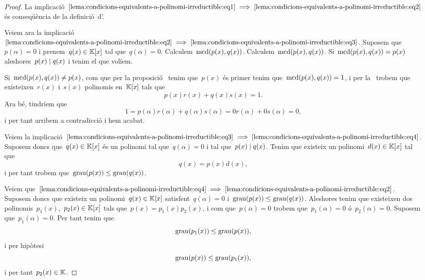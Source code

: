 \documentclass[../../main.tex]{subfiles}
\begin{document}
    \begin{proof}
        La implicació~\(\eqref{lema:condicions-equivalents-a-polinomi-irreductible:eq1}\implies\eqref{lema:condicions-equivalents-a-polinomi-irreductible:eq2}\) és conseqüència de la definició~d'.

        Veiem ara la implicació~\(\eqref{lema:condicions-equivalents-a-polinomi-irreductible:eq2}\implies\eqref{lema:condicions-equivalents-a-polinomi-irreductible:eq3}\).
        Suposem que~\(p(\alpha)=0\) i prenem~\(q(x)\in\mathbb{K}[x]\) tal que~\(q(\alpha)=0\).
        Calculem~\(\operatorname{mcd}(p(x),q(x))\).
        Calculem~\(\operatorname{mcd}(p(x),q(x))\).
        Si~\(\operatorname{mcd}(p(x),q(x))=p(x)\) aleshores~\(p(x)\mathrel{|} q(x)\) i tenim el que volíem.

        Si~\(\operatorname{mcd}(p(x),q(x))\neq p(x)\), com que per la proposició~ tenim que~\(p(x)\) és primer tenim que~\(\operatorname{mcd}(p(x),q(x))=1\), i per la~ trobem que existeixen~\(r(x)\) i~\(s(x)\) polinomis en~\(\mathbb{K}[x]\) tals que
        \[
            p(x)r(x)+q(x)s(x)=1.
        \]
        Ara bé, tindríem que
        \[
            1=p(\alpha)r(\alpha)+q(\alpha)s(\alpha)=0r(\alpha)+0s(\alpha)=0,
        \]
        i per tant arribem a contradicció i hem acabat.

        Veiem la implicació~\(\eqref{lema:condicions-equivalents-a-polinomi-irreductible:eq3}\implies\eqref{lema:condicions-equivalents-a-polinomi-irreductible:eq4}\).
        Suposem doncs que~\(q(x)\in\mathbb{K}[x]\) és un polinomi tal que~\(q(\alpha)=0\) i tal que~\(p(x)\mathrel{|} q(x)\).
        Tenim que existeix un polinomi~\(d(x)\in\mathbb{K}[x]\) tal que
        \[
            q(x)=p(x)d(x),
        \]
        i per tant trobem que~\(\operatorname{grau}(p(x))\leq\operatorname{grau}(q(x))\).

        Veiem que~\(\eqref{lema:condicions-equivalents-a-polinomi-irreductible:eq4}\implies\eqref{lema:condicions-equivalents-a-polinomi-irreductible:eq2}\).
        Suposem doncs que existeix un polinomi~\(q(x)\in\mathbb{K}[x]\) satisfent~\(q(\alpha)=0\) i~\(\operatorname{grau}(p(x))\leq\operatorname{grau}(q(x))\).
        Aleshores tenim que existeixen dos polinomis~\(p_{1}(x)\),~\(p_{2}(x)\in\mathbb{K}[x]\) tals que~\(p(x)=p_{1}(x)p_{2}(x)\), i com que~\(p(\alpha)=0\) trobem que~\(p_{1}(\alpha)=0\) ó~\(p_{2}(\alpha)=0\).
        Suposem que~\(p_{1}(\alpha)=0\).
        Per tant tenim que
        \[
            \operatorname{grau}(p_{1}(x))\leq\operatorname{grau}(p(x)),
        \]
        i per hipòtesi
        \[
            \operatorname{grau}(p(x))\leq\operatorname{grau}(p_{1}(x)),
        \]
        i per tant~\(p_{2}(x)\in\mathbb{K}\).


\end{proof}
\end{document}
